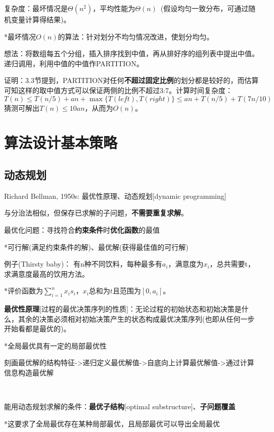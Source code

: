 \documentclass[a4paper,UTF8,fontset=windows]{ctexart}
\begin{document}
复杂度：最坏情况是$\Theta(n^2)$，平均性能为$\Theta(n)$\ (假设均匀一致分布，可通过随机变量计算得结果)。

*\hspace{0em}最坏情况$O(n)$的算法：针对划分不均匀情况改进，使划分均匀。

想法：将数组每五个分组，插入排序找到中值，再从排好序的组列表中提出中值。递归调用，利用中值的中值作PARTITION。

证明：3.3节提到，PARTITION对任何\textbf{不超过固定比例}的划分都是较好的，而估算可知这样的取中值方式可以保证两侧的比例不超过3:7。计算时间复杂度：
$$T(n)\le T(n/5)+an+\max\{T(left),T(right)\}\le an+T(n/5)+T(7n/10)$$
猜测可解出$T(n)\le10an$，从而为$O(n)$。

\section{算法设计基本策略}
\subsection{动态规划}
Richard Bellman, 1950s: 最优性原理、动态规划[dynamic programming]

与分治法相似，但保存已求解的子问题，\textbf{不需要重复求解}。

最优化问题：寻找符合\textbf{约束条件}时\textbf{优化函数}的最值

*\hspace{0em}可行解(满足约束条件的解)、最优解(获得最佳值的可行解)

例子(Thirsty baby)： 有n种不同饮料，每种最多有$a_i$，满意度为$x_i$，总共需要t，求满意度最高的饮用方法。

*\hspace{0em}评价函数为$\sum_{i=1}^nx_is_i$，$x_i$总和为$t$且范围为$[0,a_i]$。

\textbf{最优性原理}[过程的最优决策序列的性质]：无论过程的初始状态和初始决策是什么，其余的决策必须相对初始决策产生的状态构成最优决策序列(也即从任何一步开始看都是最优的)。

*\hspace{0em}全局最优具有一定的局部最优性

刻画最优解的结构特征->递归定义最优解值->自底向上计算最优解值->通过计算信息构造最优解

\

能用动态规划求解的条件：\textbf{最优子结构}[optimal substructure]、\textbf{子问题覆盖}

*\hspace{0em}这要求了全局最优存在某种局部最优，且局部最优可以导出全局最优
\end{document}
